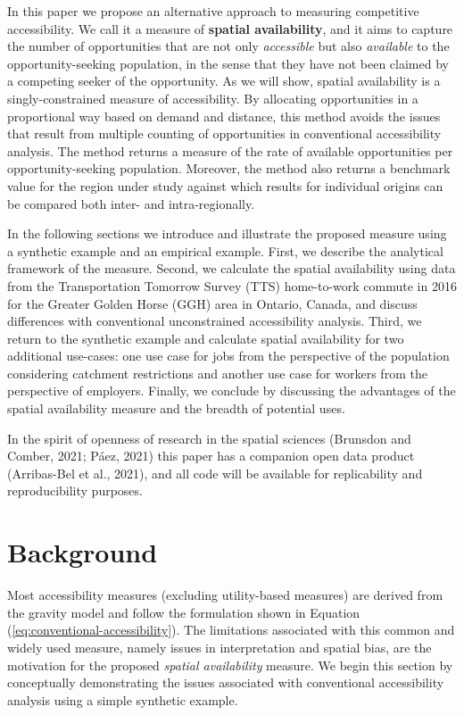 \documentclass[]{elsarticle} %
\begin{document}
In this paper we propose an alternative approach to measuring
competitive accessibility. We call it a measure of \textbf{spatial
availability}, and it aims to capture the number of opportunities that
are not only \emph{accessible} but also \emph{available} to the
opportunity-seeking population, in the sense that they have not been
claimed by a competing seeker of the opportunity. As we will show,
spatial availability is a singly-constrained measure of accessibility.
By allocating opportunities in a proportional way based on demand and
distance, this method avoids the issues that result from multiple
counting of opportunities in conventional accessibility analysis. The
method returns a measure of the rate of available opportunities per
opportunity-seeking population. Moreover, the method also returns a
benchmark value for the region under study against which results for
individual origins can be compared both inter- and intra-regionally.

In the following sections we introduce and illustrate the proposed
measure using a synthetic example and an empirical example. First, we
describe the analytical framework of the measure. Second, we calculate
the spatial availability using data from the Transportation Tomorrow
Survey (TTS) home-to-work commute in 2016 for the Greater Golden Horse
(GGH) area in Ontario, Canada, and discuss differences with conventional
unconstrained accessibility analysis. Third, we return to the synthetic
example and calculate spatial availability for two additional use-cases:
one use case for jobs from the perspective of the population considering
catchment restrictions and another use case for workers from the
perspective of employers. Finally, we conclude by discussing the
advantages of the spatial availability measure and the breadth of
potential uses.

In the spirit of openness of research in the spatial sciences (Brunsdon
and Comber, 2021; Páez, 2021) this paper has a companion open data
product (Arribas-Bel et al., 2021), and all code will be available for
replicability and reproducibility purposes.

\hypertarget{background}{%
\section{Background}\label{background}}

Most accessibility measures (excluding utility-based measures) are
derived from the gravity model and follow the formulation shown in
Equation (\ref{eq:conventional-accessibility}). The limitations
associated with this common and widely used measure, namely issues in
interpretation and spatial bias, are the motivation for the proposed
\emph{spatial availability} measure. We begin this section by
conceptually demonstrating the issues associated with conventional
accessibility analysis using a simple synthetic example.
\end{document}
